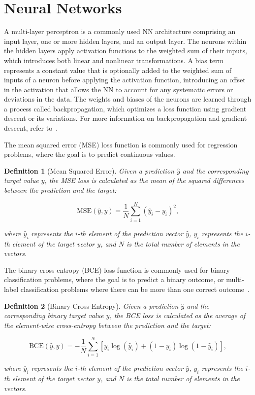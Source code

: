 \documentclass[ppgc,diss,english]{iiufrgs}
\newtheorem{definition}{Definition}
\begin{document}
\section{Neural Networks}
\label{sec:background-neural-nets}

A multi-layer perceptron is a commonly used NN architecture comprising an input layer, one or more hidden layers, and an output layer. The neurons within the hidden layers apply activation functions to the weighted sum of their inputs, which introduces both linear and nonlinear transformations. A bias term represents a constant value that is optionally added to the weighted sum of inputs of a neuron before applying the activation function, introducing an offset in the activation that allows the NN to account for any systematic errors or deviations in the data. The weights and biases of the neurons are learned through a process called backpropagation, which optimizes a loss function using gradient descent or its variations. For more information on backpropagation and gradient descent, refer to~\citet{Goodfellow.etal/2016}.

The mean squared error (MSE) loss function is commonly used for regression problems, where the goal is to predict continuous values.
\begin{definition}[Mean Squared Error]\label{def:mse}
Given a prediction $\hat{y}$ and the corresponding target value $y$, the MSE loss is calculated as the mean of the squared differences between the prediction and the target:

$$\text{MSE}(\hat{y}, y) = \frac{1}{N} \sum_{i=1}^{N} (\hat{y}_i - y_i)^2,$$

where $\hat{y}_i$ represents the $i$-th element of the prediction vector $\hat{y}$, $y_i$ represents the $i$-th element of the target vector $y$, and $N$ is the total number of elements in the vectors.
\end{definition}

The binary cross-entropy (BCE) loss function is commonly used for binary classification problems, where the goal is to predict a binary outcome, or multi-label classification problems where there can be more than one correct outcome~\cite{Tsoumakas.etal/2007}.
\begin{definition}[Binary Cross-Entropy]\label{def:mse}
Given a prediction $\hat{y}$ and the corresponding binary target value $y$, the BCE loss is calculated as the average of the element-wise cross-entropy between the prediction and the target:

$$\text{BCE}(\hat{y}, y) = -\frac{1}{N} \sum_{i=1}^{N} \left[y_i \log(\hat{y}_i) + (1 - y_i) \log(1 - \hat{y}_i)\right],$$

where $\hat{y}_i$ represents the $i$-th element of the prediction vector $\hat{y}$, $y_i$ represents the $i$-th element of the target vector $y$, and $N$ is the total number of elements in the vectors.
\end{definition}
\end{document}
